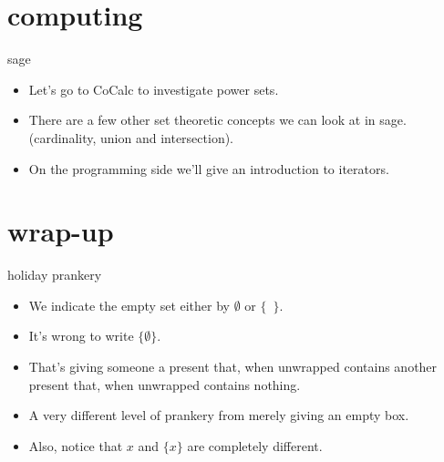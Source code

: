 \documentclass[handout,landscape]{beamer}
\begin{document}
\section{computing}

\begin{frame}{sage}
\begin{itemize}
\item Let's go to CoCalc to investigate power sets. \pause
\item There are a few other set theoretic concepts we can look at in sage. (cardinality, union and intersection). \pause
\item On the programming side we'll give an introduction to iterators. \pause
\end{itemize}
\end{frame}

\section{wrap-up}

\begin{frame}{holiday prankery}
\begin{itemize}
\item We indicate the empty set either by $\emptyset$ or $\{\phantom{1}\}$.  \pause
\item It's wrong to write $\{\emptyset\}$. \pause
\item That's giving someone a present that, when unwrapped contains another present that, when unwrapped contains nothing. \pause
\item A very different level of prankery from merely giving an empty box.\pause
\item Also, notice that $x$ and $\{x\}$ are completely different. 
\end{itemize}
\end{frame}
\end{document}
